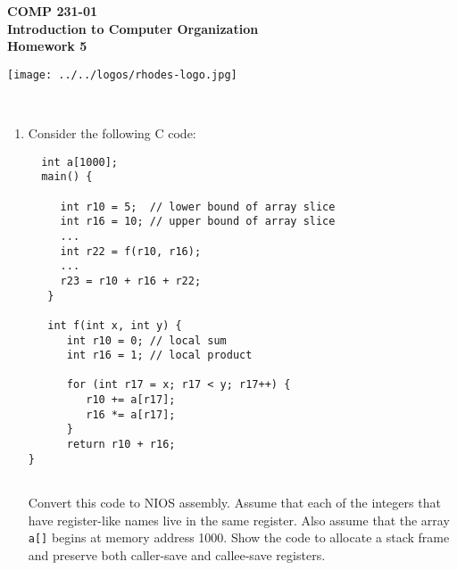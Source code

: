 \documentclass[10pt]{article}
\begin{document}

\hspace{-5mm}
\begin{minipage}{0.65\linewidth}
  \textbf{
      \hspace{-3mm}
      {\Large COMP 231-01}\\
      {\Large Introduction to Computer Organization}\\
      {\Large Homework 5}}
\end{minipage}
\begin{minipage}{0.35\linewidth}
  \texttt{[image: ../../logos/rhodes-logo.jpg]}
\end{minipage}

\\


\begin{enumerate}

\setlength\itemsep{10mm}

\item Consider the following C code:

\begin{verbatim}
  int a[1000];
  main() {

     int r10 = 5;  // lower bound of array slice
     int r16 = 10; // upper bound of array slice
     ...
     int r22 = f(r10, r16);
     ...
     r23 = r10 + r16 + r22;
   }   

   int f(int x, int y) {
      int r10 = 0; // local sum
      int r16 = 1; // local product
      
      for (int r17 = x; r17 < y; r17++) {
         r10 += a[r17];
         r16 *= a[r17];
      }
      return r10 + r16;
}
 
\end{verbatim}

Convert this code to NIOS assembly. Assume that each of the integers
that have register-like names live in the same register. Also assume
that the array {\tt a[]} begins at memory address 1000. Show the code
to allocate a stack frame and preserve both caller-save and
callee-save registers.

\end{enumerate}
\end{document}
